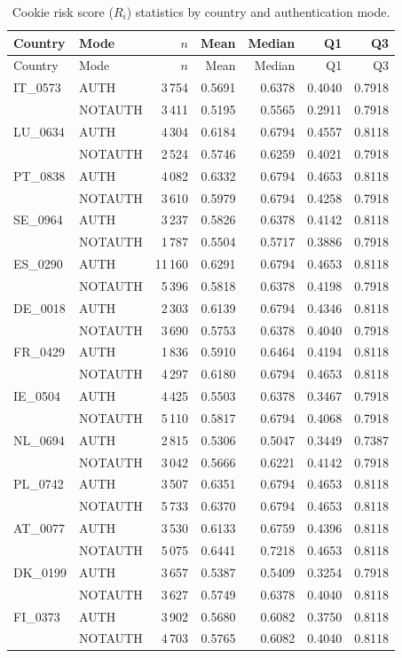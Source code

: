 \documentclass[11pt,a4paper]{article}
\begin{document}
\begingroup\footnotesize\setlength{\tabcolsep}{4pt}
\begin{longtable}{llrrrrr}
\caption{Cookie risk score ($R_i$) statistics by country and authentication mode.}\label{tab:risk_cookie}\\
\toprule
Country & Mode & $n$ & Mean & Median & Q1 & Q3 \\
\midrule
\endfirsthead
\toprule
Country & Mode & $n$ & Mean & Median & Q1 & Q3 \\
\midrule
\endhead
IT\_0573 & AUTH & 3\,754 & 0.5691 & 0.6378 & 0.4040 & 0.7918 \\
 & NOTAUTH & 3\,411 & 0.5195 & 0.5565 & 0.2911 & 0.7918 \\
LU\_0634 & AUTH & 4\,304 & 0.6184 & 0.6794 & 0.4557 & 0.8118 \\
 & NOTAUTH & 2\,524 & 0.5746 & 0.6259 & 0.4021 & 0.7918 \\
PT\_0838 & AUTH & 4\,082 & 0.6332 & 0.6794 & 0.4653 & 0.8118 \\
 & NOTAUTH & 3\,610 & 0.5979 & 0.6794 & 0.4258 & 0.7918 \\
SE\_0964 & AUTH & 3\,237 & 0.5826 & 0.6378 & 0.4142 & 0.8118 \\
 & NOTAUTH & 1\,787 & 0.5504 & 0.5717 & 0.3886 & 0.7918 \\
ES\_0290 & AUTH & 11\,160 & 0.6291 & 0.6794 & 0.4653 & 0.8118 \\
 & NOTAUTH & 5\,396 & 0.5818 & 0.6378 & 0.4198 & 0.7918 \\
DE\_0018 & AUTH & 2\,303 & 0.6139 & 0.6794 & 0.4346 & 0.8118 \\
 & NOTAUTH & 3\,690 & 0.5753 & 0.6378 & 0.4040 & 0.7918 \\
FR\_0429 & AUTH & 1\,836 & 0.5910 & 0.6464 & 0.4194 & 0.8118 \\
 & NOTAUTH & 4\,297 & 0.6180 & 0.6794 & 0.4653 & 0.8118 \\
IE\_0504 & AUTH & 4\,425 & 0.5503 & 0.6378 & 0.3467 & 0.7918 \\
 & NOTAUTH & 5\,110 & 0.5817 & 0.6794 & 0.4068 & 0.7918 \\
NL\_0694 & AUTH & 2\,815 & 0.5306 & 0.5047 & 0.3449 & 0.7387 \\
 & NOTAUTH & 3\,042 & 0.5666 & 0.6221 & 0.4142 & 0.7918 \\
PL\_0742 & AUTH & 3\,507 & 0.6351 & 0.6794 & 0.4653 & 0.8118 \\
 & NOTAUTH & 5\,733 & 0.6370 & 0.6794 & 0.4653 & 0.8118 \\
AT\_0077 & AUTH & 3\,530 & 0.6133 & 0.6759 & 0.4396 & 0.8118 \\
 & NOTAUTH & 5\,075 & 0.6441 & 0.7218 & 0.4653 & 0.8118 \\
DK\_0199 & AUTH & 3\,657 & 0.5387 & 0.5409 & 0.3254 & 0.7918 \\
 & NOTAUTH & 3\,627 & 0.5749 & 0.6378 & 0.4040 & 0.8118 \\
FI\_0373 & AUTH & 3\,902 & 0.5680 & 0.6082 & 0.3750 & 0.8118 \\
 & NOTAUTH & 4\,703 & 0.5765 & 0.6082 & 0.4040 & 0.8118 \\
\bottomrule
\end{longtable}
\endgroup
\end{document}
